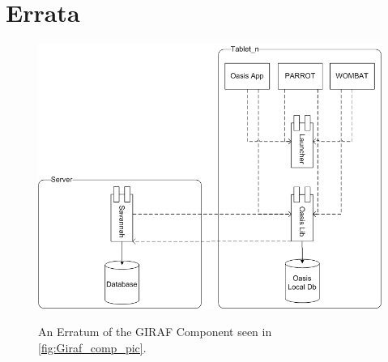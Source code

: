 \chapter{Errata}

\begin{figure}
	\centering
		\includegraphics[width=\textwidth]{input/images/Giraf_comp_pic_fix.png}
	\label{fig:Giraf_comp_pic_fix}
	\caption{An Erratum of the GIRAF Component seen in \autoref{fig:Giraf_comp_pic}.}
\end{figure}
